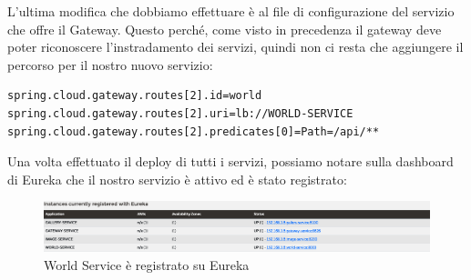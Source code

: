 L'ultima modifica che dobbiamo effettuare è al file di configurazione del servizio che offre il Gateway. Questo perché, come visto in precedenza il gateway deve poter riconoscere l'instradamento dei servizi, quindi non ci resta che aggiungere il percorso per il nostro nuovo servizio:

\begin{lstlisting}[caption= Configurazione per il Gateway]
spring.cloud.gateway.routes[2].id=world
spring.cloud.gateway.routes[2].uri=lb://WORLD-SERVICE
spring.cloud.gateway.routes[2].predicates[0]=Path=/api/**
\end{lstlisting}

Una volta effettuato il deploy di tutti i servizi, possiamo notare sulla dashboard di Eureka che il nostro servizio è attivo ed è stato registrato:

\begin{figure}[h]
    \centering
    \includegraphics[scale = 0.20]{capitoli/immagini/18_world_eureka.png}
    \caption{World Service è registrato su Eureka}
    \label{fig:world_eureka}
\end{figure}